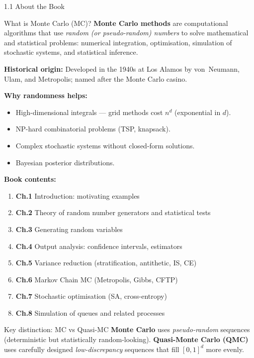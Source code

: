 \documentclass[aspectratio=169,10pt]{beamer}
\begin{document}
\begin{frame}[allowframebreaks]{1.1 About the Book}

  \begin{block}{What is Monte Carlo (MC)?}
    \textbf{Monte Carlo methods} are computational algorithms that use
    \emph{random (or pseudo-random) numbers} to solve mathematical and
    statistical problems: numerical integration, optimisation, simulation
    of stochastic systems, and statistical inference.
  \end{block}

  \textbf{Historical origin:} Developed in the 1940s at Los Alamos by
  von~Neumann, Ulam, and Metropolis; named after the Monte Carlo casino.

  \bigskip
  \textbf{Why randomness helps:}
  \begin{itemize}
    \item High-dimensional integrals --- grid methods cost $n^d$ (exponential in $d$).
    \item NP-hard combinatorial problems (TSP, knapsack).
    \item Complex stochastic systems without closed-form solutions.
    \item Bayesian posterior distributions.
  \end{itemize}

  \framebreak

  \textbf{Book contents:}
  \begin{enumerate}
    \item \textbf{Ch.1} Introduction: motivating examples
    \item \textbf{Ch.2} Theory of random number generators and statistical tests
    \item \textbf{Ch.3} Generating random variables
    \item \textbf{Ch.4} Output analysis: confidence intervals, estimators
    \item \textbf{Ch.5} Variance reduction (stratification, antithetic, IS, CE)
    \item \textbf{Ch.6} Markov Chain MC (Metropolis, Gibbs, CFTP)
    \item \textbf{Ch.7} Stochastic optimisation (SA, cross-entropy)
    \item \textbf{Ch.8} Simulation of queues and related processes
  \end{enumerate}

  \begin{alertblock}{Key distinction: MC vs Quasi-MC}
    \textbf{Monte Carlo} uses \emph{pseudo-random} sequences (deterministic
    but statistically random-looking).
    \textbf{Quasi-Monte Carlo (QMC)} uses carefully designed
    \emph{low-discrepancy} sequences that fill $[0,1]^d$ more evenly.
  \end{alertblock}

\end{frame}
\end{document}
